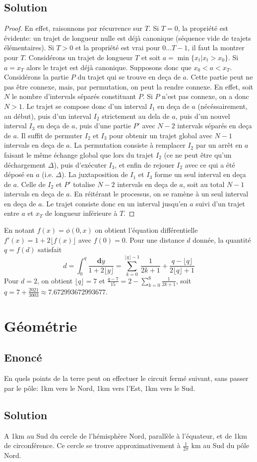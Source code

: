 \documentclass{article}
\newenvironment{statement}{\subsection{Enoncé}}{\pagebreak}
\newenvironment{solution}{\subsection{Solution}}{\pagebreak}
\begin{document}
\begin{solution}
\begin{proof}
En effet, raisonnons par récurrence sur $T$. Si $T=0$, la propriété est évidente: un trajet de longueur nulle est déjà canonique (séquence vide de trajets élémentaires). Si $T>0$ et la propriété est vrai pour $0\ldots T-1$, il faut la montrer pour $T$. Considérons un trajet de longueur $T$ et soit $a=\min\{x_t|x_t>x_0\}$. Si $a=x_T$ alors le trajet est déjà canonique. Supposons donc que $x_0<a<x_T$. Considérons la partie $P$ du trajet qui se trouve en deça de $a$. Cette partie peut ne pas être connexe, mais, par permutation, on peut la rendre connexe. En effet, soit $N$ le nombre d'intervals séparés constituant $P$. Si $P$ n'est pas connexe, on a donc $N>1$. Le trajet se compose donc d'un interval $I_1$ en deça de $a$ (nécéssairement, au début), puis d'un interval $I_2$ strictement au dela de $a$, puis d'un nouvel interval $I_3$ en deça de $a$, puis d'une partie $P'$ avec $N-2$ intervals séparés en deça de $a$. Il suffit de permuter $I_2$ et $I_3$ pour obtenir un trajet global avec $N-1$ intervals en deça de $a$. La permutation consiste à remplacer $I_2$ par un arrêt en $a$ faisant le même échange global que lors du trajet $I_2$ (ce ne peut être qu'un déchargement $\Delta$), puis d'exécuter $I_3$, et enfin de rejouer $I_2$ avec ce qui a été déposé en $a$ (i.e. $\Delta$). La juxtaposition de $I_1$ et $I_3$ forme un seul interval en deça de $a$. Celle de $I_2$ et $P'$ totalise $N-2$ intervals en deça de $a$, soit au total $N-1$ intervals en deça de $a$. En réitérant le processus, on se ramène à un seul interval en deça de $a$. Le trajet consiste donc en un interval jusqu'en $a$ suivi d'un trajet entre $a$ et $x_T$ de longueur inférieure à $T$.
\end{proof}
En notant $f(x)=\phi(0,x)$ on obtient l'équation différentielle $f'(x)=1+2\lfloor f(x)\rfloor$ avec $f(0)=0$. Pour une distance $d$ donnée, la quantité $q=f(d)$ satisfait
\[
d = \int_0^q\frac{\mathbf{d}y}{1+2\lfloor y\rfloor} =
\sum_{k=0}^{\lfloor q\rfloor-1}\frac{1}{2k+1}+\frac{q-\lfloor q\rfloor}{2\lfloor q\rfloor+1}
\]
Pour $d=2$, on obtient $\lfloor q\rfloor=7$ et $\frac{q-7}{15}=2-\sum_{k=0}^{6}\frac{1}{2k+1}$, soit $q=7+\frac{2021}{3003}\approx7.672993672993677$.
\end{solution}

\section{Géométrie}
\begin{statement}
En quels points de la terre peut on effectuer le circuit fermé suivant, sans passer par le pôle: 1km vers le Nord, 1km vers l'Est, 1km vers le Sud.
\end{statement}
\begin{solution}
A 1km au Sud du cercle de l'hémisphère Nord, parallèle à l'équateur, et de 1km de circonférence. Ce cercle se trouve approximativement à $\frac{1}{2\pi}$ km au Sud du pôle Nord.
\end{solution}
\appendix
\newpage
\end{document}
